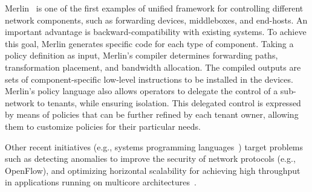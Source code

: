 Merlin~\cite{soule2013} is one of the first examples of unified framework for controlling different network components, such as forwarding devices, middleboxes, and end-hosts.
An important advantage is backward-compatibility with existing systems.
To achieve this goal, Merlin generates specific code for each type of component.
Taking a policy definition as input, Merlin's compiler determines forwarding 
paths, transformation placement, and bandwidth allocation.
The compiled outputs are sets of component-specific 
low-level instructions to be installed in the devices.
Merlin's policy language also allows operators to delegate the control of a sub-network to tenants, while ensuring isolation.
This delegated control is expressed by means of policies that can be further refined 
by each tenant owner, allowing them to customize policies for their particular needs. 

Other recent initiatives (e.g., systems programming languages~\cite{casey2013}) 
target problems such as detecting anomalies to improve the security of network protocols (e.g., OpenFlow), 
and optimizing horizontal scalability for achieving high throughput in applications running on multicore 
architectures~\cite{voellmy2013}.

